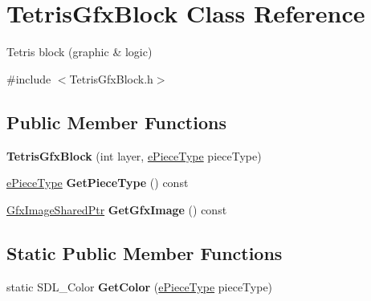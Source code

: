 \hypertarget{classTetrisGfxBlock}{\section{Tetris\-Gfx\-Block Class Reference}
\label{classTetrisGfxBlock}
}


Tetris block (graphic \& logic)  




{\ttfamily \#include $<$Tetris\-Gfx\-Block.\-h$>$}

\subsection*{Public Member Functions}
\begin{DoxyCompactItemize}
\item 
\hypertarget{classTetrisGfxBlock_a3c40c0c9117cde6a8af4a7f501a519dd}{{\bfseries Tetris\-Gfx\-Block} (int layer, \hyperlink{TetrisGfxBlock_8h_a2592cbf66d668df0e31fa8d0d8a174de}{e\-Piece\-Type} piece\-Type)}\label{classTetrisGfxBlock_a3c40c0c9117cde6a8af4a7f501a519dd}

\item 
\hypertarget{classTetrisGfxBlock_a3b57d51e081349df4704753d4073ac1d}{\hyperlink{TetrisGfxBlock_8h_a2592cbf66d668df0e31fa8d0d8a174de}{e\-Piece\-Type} {\bfseries Get\-Piece\-Type} () const }\label{classTetrisGfxBlock_a3b57d51e081349df4704753d4073ac1d}

\item 
\hypertarget{classTetrisGfxBlock_ab1ca5f22e77e6266f1d166a88d202af1}{\hyperlink{GfxImage_8h_a42b2baf6110731a1a358d365e303e086}{Gfx\-Image\-Shared\-Ptr} {\bfseries Get\-Gfx\-Image} () const }\label{classTetrisGfxBlock_ab1ca5f22e77e6266f1d166a88d202af1}

\end{DoxyCompactItemize}
\subsection*{Static Public Member Functions}
\begin{DoxyCompactItemize}
\item 
\hypertarget{classTetrisGfxBlock_a344f48c524aa3c2cb13237297f38f19b}{static S\-D\-L\-\_\-\-Color {\bfseries Get\-Color} (\hyperlink{TetrisGfxBlock_8h_a2592cbf66d668df0e31fa8d0d8a174de}{e\-Piece\-Type} piece\-Type)}\label{classTetrisGfxBlock_a344f48c524aa3c2cb13237297f38f19b}

\end{DoxyCompactItemize}
